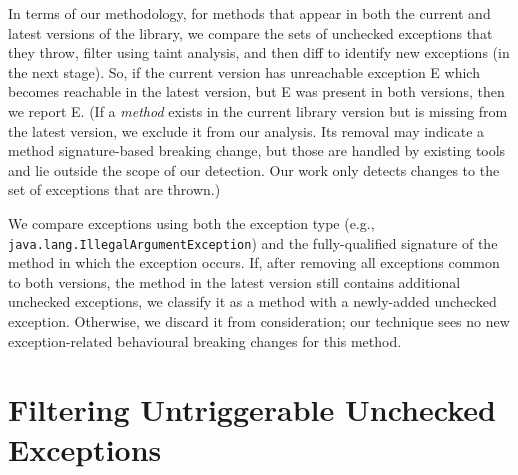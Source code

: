 

In terms of our methodology, for methods that appear in both the current and latest versions of the library, we compare the sets of unchecked exceptions that they throw, filter using taint analysis, and then diff to identify new exceptions (in the next stage). So, if the current version has unreachable exception E which becomes reachable in the latest version, but E was present in both versions, then we report E. (If a \emph{method} exists in the current library version but is missing from the latest version, we exclude it from our analysis. Its removal may indicate a method signature-based breaking change, but those are handled by existing tools and lie outside the scope of our detection. Our work only detects changes to the set of exceptions that are thrown.)

We compare exceptions using both the exception type (e.g., \texttt{java.lang.IllegalArgumentException}) and the fully-qualified signature of the method in which the exception occurs. If, after removing all exceptions common to both versions, the method in the latest version still contains additional unchecked exceptions, we classify it as a method with a newly-added unchecked exception. Otherwise, we discard it from consideration; our technique sees no new exception-related behavioural breaking changes for this method.

\section{Filtering Untriggerable Unchecked Exceptions}

